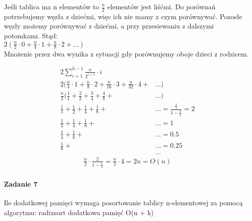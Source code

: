 \documentclass[18pt]{extarticle}
\begin{document}
Jeśli tablica ma n elementów to $\frac{n}{2}$ elementów jest liśćmi. Do porównań potrzebujemy węzła z dziećmi, więc ich nie mamy z czym porównywać. Pozosłe węzły możemy porównywać z dziećmi, a przy przesiewaniu z dalszymi potomkami. Stąd: \\

$2(\frac{n}{2} \cdot 0 + \frac{n}{4} \cdot 1 + \frac{n}{8} \cdot 2 + ...)$ \\

Mnożenie przez dwa wynika z sytuacji gdy porównujemy oboje dzieci z rodzicem.

\begin{align*}
    2 \sum_{i=1}^{h-1} \frac{n}{2^{i+1}} \cdot i                                                 &                                               \\
    2 (\frac{n}{4} \cdot 1 + \frac{n}{8} \cdot 2 + \frac{n}{16} \cdot 3 + \frac{n}{32} \cdot 4 + & \dots)                                        \\
    \frac{n}{2} (\frac{1}{1} + \frac{2}{2} + \frac{3}{4} + \frac{4}{8} +                         & \dots)                                        \\
    \frac{1}{1} +  \frac{1}{2} +  \frac{1}{4} +  \frac{1}{8} +                                   & \dots = \frac{\frac{1}{1}}{1-\frac{1}{2}} = 2 \\
    \frac{1}{2} +  \frac{1}{4} +  \frac{1}{8} +                                                  & \dots = 1                                     \\
    \frac{1}{4} +  \frac{1}{8} +                                                                 & \dots = 0.5                                   \\
    \frac{1}{8} +                                                                                & \dots = 0.25                                  \\
                                                                                                 & \dots
\end{align*}
\begin{gather*}
    \frac{n}{2} \cdot \frac{2}{1-\frac{1}{2}} = \frac{n}{2} \cdot 4 = 2n = O(n)
\end{gather*}

\paragraph{Zadanie 7} Ile dodatkowej pamięci wymaga posortowanie tablicy n-elementowej za pomocą algorytmu:
radixsort dodatkowa pamięć O(n + k)\\
\end{document}
